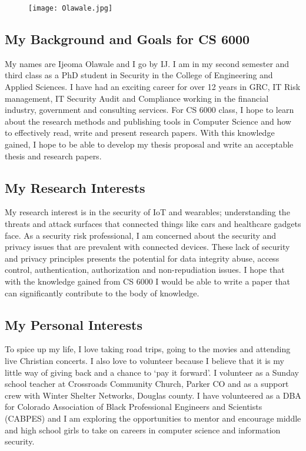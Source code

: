 \begin{figure}
\centering
\texttt{[image: Olawale.jpg]}
\end{figure}
\subsection{My Background and Goals for CS 6000}
My names are Ijeoma Olawale and I go by IJ. I am in my second semester and third class as a PhD student in Security in the College of Engineering and Applied Sciences. I have had an exciting career for over 12 years in GRC, IT Risk management, IT Security Audit and Compliance working in the financial industry, government and consulting services. For CS 6000 class, I hope to learn about the research methods and publishing tools in Computer Science and how to effectively read, write and present research papers. With this knowledge gained, I hope to be able to develop my thesis proposal and write an acceptable thesis and research papers. 
\subsection{My Research Interests}
My research interest is in the security of IoT and wearables; understanding the threats and attack surfaces that connected things like cars and healthcare gadgets face. As a security risk professional, I am concerned about the security and privacy issues that are prevalent with connected devices. These lack of security and privacy principles presents the potential for data integrity abuse, access control, authentication, authorization and non-repudiation issues. I hope that with the knowledge gained from CS 6000 I would be able to write a paper that can significantly contribute to the body of knowledge.
\subsection{My Personal Interests}
To spice up my life, I love taking road trips, going to the movies and attending live Christian concerts. I also love to volunteer because I believe that it is my little way of giving back and a chance to ‘pay it forward’. I volunteer as a Sunday school teacher at Crossroads Community Church, Parker CO and as a support crew with Winter Shelter Networks, Douglas county. I have volunteered as a DBA for Colorado Association of Black Professional Engineers and Scientists (CABPES) and I am exploring the opportunities to mentor and encourage middle and high school girls to take on careers in computer science and information security.


